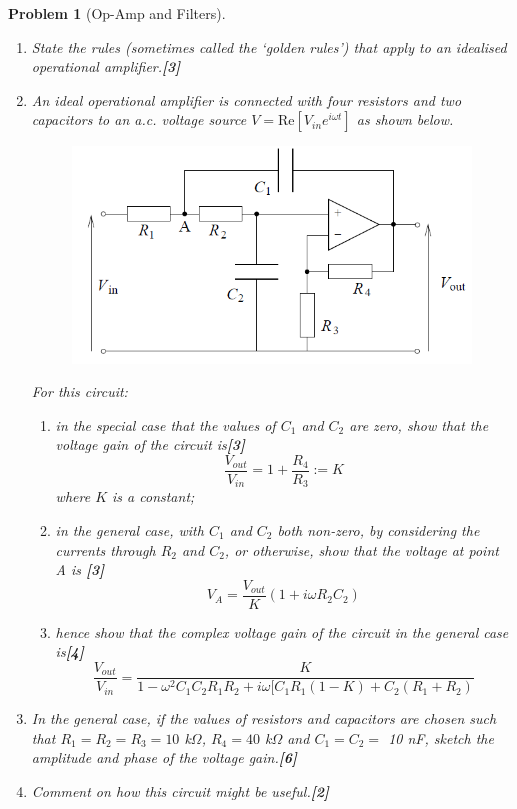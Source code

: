 \documentclass[a4paper]{article}
\theoremstyle{new}
\newtheorem{qns}{Problem}[subsection]
\begin{document}
\begin{qns}[Op-Amp and Filters]\leavevmode
\begin{enumerate}[label=(\roman*)]
\item State the rules (sometimes called the ‘golden rules’) that apply to an idealised operational amplifier.\hfill\textbf{[3]}
\item An ideal operational amplifier is connected with four resistors and two capacitors to an a.c. voltage source $V=\text{Re}[V_{in}e^{i\omega t}]$ as shown below.
\begin{figure}[H]
    \centering
    \includegraphics[scale=0.75]{2012P1D13Q.PNG}
\end{figure}
For this circuit:
\begin{enumerate}[label=(\alph*)]
\item in the special case that the values of $C_1$ and $C_2$ are zero, show that the voltage gain of the circuit is\hfill\textbf{[3]}
$$\frac{V_{out}}{V_{in}}=1+\frac{R_4}{R_3}:=K$$
where $K$ is a constant;
\item in the general case, with $C_1$ and $C_2$ both non-zero, by considering the currents through $R_2$ and $C_2$, or otherwise, show that the voltage at point A is \hfill\textbf{[3]}
$$V_A=\frac{V_{out}}{K}(1+i\omega R_2C_2)$$
\item hence show that the complex voltage gain of the circuit in the general case is\hfill\textbf{[4]}
$$\frac{V_{out}}{V_{in}}=\frac{K}{1-\omega^2C_1C_2R_1R_2+i\omega[C_1R_1(1-K)+C_2(R_1+R_2)}$$
\end{enumerate}
\item In the general case, if the values of resistors and capacitors are chosen such that $R_1 = R_2 = R_3 = 10$ k$\Omega$, $R_4 = 40$ k$\Omega$ and $C_1 = C_2 =$ 10 nF, sketch the amplitude and phase of the voltage gain.\hfill\textbf{[6]}
\item Comment on how this circuit might be useful.\hfill\textbf{[2]}
\end{enumerate}
\end{qns}
\end{document}
